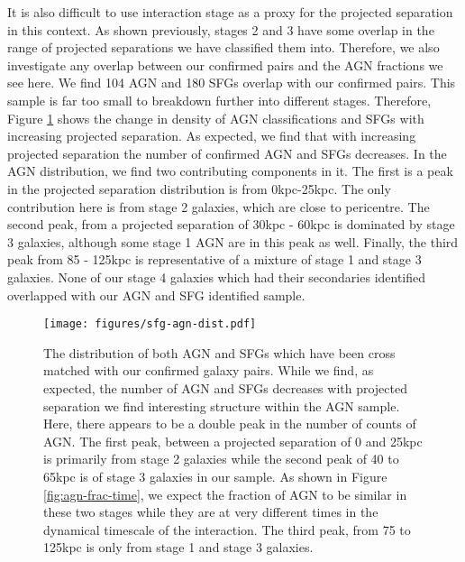 \documentclass[fleqn,usenatbib]{mnras}
\begin{document}
It is also difficult to use interaction stage as a proxy for the projected separation in this context. As shown previously, stages 2 and 3 have some overlap in the range of projected separations we have classified them into. Therefore, we also investigate any overlap between our confirmed pairs and the AGN fractions we see here. We find 104 AGN and 180 SFGs overlap with our confirmed pairs. This sample is far too small to breakdown further into different stages. Therefore, Figure \ref{fig:sfg-agn-proj} shows the change in density of AGN classifications and SFGs with increasing projected separation. As expected, we find that with increasing projected separation the number of confirmed AGN and SFGs decreases. In the AGN distribution, we find two contributing components in it. The first is a peak in the projected separation distribution is from 0kpc-25kpc. The only contribution here is from stage 2 galaxies, which are close to pericentre. The second peak, from a projected separation of 30kpc - 60kpc is dominated by stage 3 galaxies, although some stage 1 AGN are in this peak as well. Finally, the third peak from 85 - 125kpc is representative of a mixture of stage 1 and stage 3 galaxies. None of our stage 4 galaxies which had their secondaries identified overlapped with our AGN and SFG identified sample.

\begin{figure}
    \centering
    \texttt{[image: figures/sfg-agn-dist.pdf]}
    \caption{The distribution of both AGN and SFGs which have been cross matched with our confirmed galaxy pairs. While we find, as expected, the number of AGN and SFGs decreases with projected separation we find interesting structure within the AGN sample. Here, there appears to be a double peak in the number of counts of AGN. The first peak, between a projected separation of 0 and 25kpc is primarily from stage 2 galaxies while the second peak of 40 to 65kpc is of stage 3 galaxies in our sample. As shown in Figure \ref{fig:agn-frac-time}, we expect the fraction of AGN to be similar in these two stages while they are at very different times in the dynamical timescale of the interaction. The third peak, from 75 to 125kpc is only from stage 1 and stage 3 galaxies.}
    \label{fig:sfg-agn-proj}
\end{figure}
\end{document}
